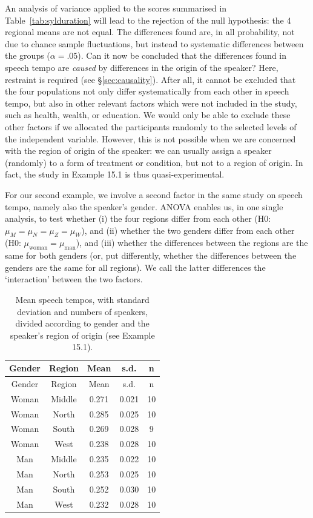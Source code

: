 \documentclass[
]{book}
\begin{document}
An analysis of variance applied to the scores summarised in
Table~\ref{tab:sylduration}
will lead to the rejection of the null hypothesis: the 4 regional
means are not equal. The differences found are, in all probability, not due to
chance sample fluctuations, but instead to systematic differences between
the groups (\(\alpha=.05\)). Can it now be concluded that the differences
found in speech tempo are \emph{caused} by differences in the origin of the
speaker? Here, restraint is required (see
§\ref{sec:causality}). After all, it cannot be excluded that
the four populations not only differ systematically from each other in speech
tempo, but also in other relevant factors which were not included in the study,
such as health, wealth, or education. We would only be able to exclude these other
factors if we allocated the participants randomly to the selected levels of the
independent variable. However, this is not possible when we are concerned with the
region of origin of the speaker: we can usually assign a speaker (randomly)
to a form of treatment or condition, but not to a region of origin. In fact,
the study in Example 15.1 is thus quasi-experimental.

For our second example, we involve a second factor in the same study
on speech tempo, namely also the speaker's gender.
ANOVA enables us, in one single analysis, to test whether (i) the four
regions differ from each other (H0: \(\mu_M = \mu_N = \mu_Z = \mu_W\)), and
(ii) whether the two genders differ from each other (H0:
\(\mu_\textrm{woman} = \mu_\textrm{man}\)), and (iii) whether the differences
between the regions are the same for both genders (or, put differently, whether
the differences between the genders are the same for all
regions). We call the latter differences the `interaction' between the two factors.

\begin{longtable}[]{@{}ccccc@{}}
\caption{\label{tab:sylduration2way} Mean speech tempos, with standard deviation and
numbers of speakers, divided according to gender and the speaker's region of origin
(see Example 15.1).}\tabularnewline
\toprule
Gender & Region & Mean & s.d. & n \\
\midrule
\endfirsthead
\toprule
Gender & Region & Mean & s.d. & n \\
\midrule
\endhead
Woman & Middle & 0.271 & 0.021 & 10 \\
Woman & North & 0.285 & 0.025 & 10 \\
Woman & South & 0.269 & 0.028 & 9 \\
Woman & West & 0.238 & 0.028 & 10 \\
Man & Middle & 0.235 & 0.022 & 10 \\
Man & North & 0.253 & 0.025 & 10 \\
Man & South & 0.252 & 0.030 & 10 \\
Man & West & 0.232 & 0.028 & 10 \\
\bottomrule
\end{longtable}
\end{document}

